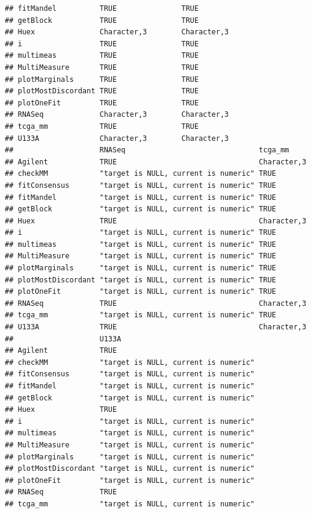 \documentclass{article}\usepackage[]{graphicx}\usepackage[]{color}
\makeatletter
\newenvironment{kframe}{%
 \def\at@end@of@kframe{}%
 \ifinner\ifhmode%
  \def\at@end@of@kframe{\end{minipage}}%
  \begin{minipage}{\columnwidth}%
 \fi\fi%
 \def\FrameCommand##1{\hskip\@totalleftmargin \hskip-\fboxsep
 \colorbox{shadecolor}{##1}\hskip-\fboxsep
     \hskip-\linewidth \hskip-\@totalleftmargin \hskip\columnwidth}%
 \MakeFramed {\advance\hsize-\width
   \@totalleftmargin\z@ \linewidth\hsize
   \@setminipage}}%
 {\par\unskip\endMakeFramed%
 \at@end@of@kframe}
\newenvironment{knitrout}{}{} %
\makeatother
\begin{document}
\begin{knitrout}
\begin{kframe}
\begin{verbatim}
## fitMandel          TRUE               TRUE       
## getBlock           TRUE               TRUE       
## Huex               Character,3        Character,3
## i                  TRUE               TRUE       
## multimeas          TRUE               TRUE       
## MultiMeasure       TRUE               TRUE       
## plotMarginals      TRUE               TRUE       
## plotMostDiscordant TRUE               TRUE       
## plotOneFit         TRUE               TRUE       
## RNASeq             Character,3        Character,3
## tcga_mm            TRUE               TRUE       
## U133A              Character,3        Character,3
##                    RNASeq                               tcga_mm    
## Agilent            TRUE                                 Character,3
## checkMM            "target is NULL, current is numeric" TRUE       
## fitConsensus       "target is NULL, current is numeric" TRUE       
## fitMandel          "target is NULL, current is numeric" TRUE       
## getBlock           "target is NULL, current is numeric" TRUE       
## Huex               TRUE                                 Character,3
## i                  "target is NULL, current is numeric" TRUE       
## multimeas          "target is NULL, current is numeric" TRUE       
## MultiMeasure       "target is NULL, current is numeric" TRUE       
## plotMarginals      "target is NULL, current is numeric" TRUE       
## plotMostDiscordant "target is NULL, current is numeric" TRUE       
## plotOneFit         "target is NULL, current is numeric" TRUE       
## RNASeq             TRUE                                 Character,3
## tcga_mm            "target is NULL, current is numeric" TRUE       
## U133A              TRUE                                 Character,3
##                    U133A                               
## Agilent            TRUE                                
## checkMM            "target is NULL, current is numeric"
## fitConsensus       "target is NULL, current is numeric"
## fitMandel          "target is NULL, current is numeric"
## getBlock           "target is NULL, current is numeric"
## Huex               TRUE                                
## i                  "target is NULL, current is numeric"
## multimeas          "target is NULL, current is numeric"
## MultiMeasure       "target is NULL, current is numeric"
## plotMarginals      "target is NULL, current is numeric"
## plotMostDiscordant "target is NULL, current is numeric"
## plotOneFit         "target is NULL, current is numeric"
## RNASeq             TRUE                                
## tcga_mm            "target is NULL, current is numeric"

\end{verbatim}
\end{kframe}
\end{knitrout}
\end{document}

